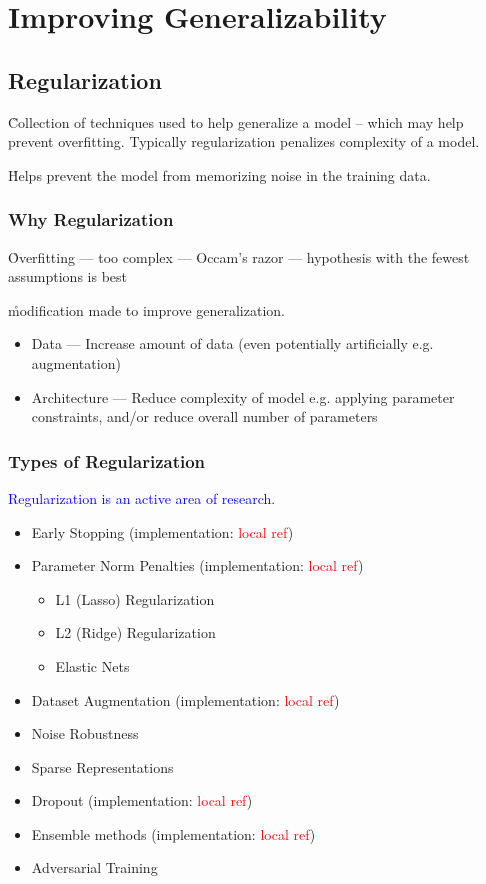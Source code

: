 \section{Improving Generalizability}

\subsection{Regularization}

\r{Collection of techniques used to help generalize a model -- which may help prevent overfitting. Typically regularization penalizes complexity of a model.}


\r{Helps prevent the model from memorizing noise in the training data.}


\subsubsection{Why Regularization}

\r{Overfitting --- too complex --- Occam's razor --- hypothesis with the fewest assumptions is best}

\r{modification made to improve generalization.}

\begin{itemize}
	\item Data --- Increase amount of data (even potentially artificially e.g. augmentation)
	\item Architecture --- Reduce complexity of model e.g. applying parameter constraints, and/or reduce overall number of parameters
\end{itemize}


\subsubsection{Types of Regularization}

\textcolor{blue}{Regularization is an active area of research.}

\begin{itemize}
	\item Early Stopping (implementation: \textcolor{red}{local ref})
	\item Parameter Norm Penalties (implementation: \textcolor{red}{local ref})
	\begin{itemize}
		\item L1 (Lasso) Regularization
		\item L2 (Ridge) Regularization
		\item Elastic Nets
	\end{itemize}
	\item Dataset Augmentation (implementation: \textcolor{red}{local ref})
	\item Noise Robustness
	\item Sparse Representations
	\item Dropout (implementation: \textcolor{red}{local ref})
	\item Ensemble methods (implementation: \textcolor{red}{local ref})
	\item Adversarial Training
\end{itemize}


